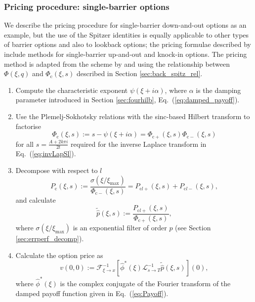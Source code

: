 \documentclass[11pt,a4paper]{article}
\begin{document}
\subsubsection{Pricing procedure: single-barrier options}\label{sec:updatedproc_sing}

We describe the pricing procedure for single-barrier down-and-out options as an example, but the use of the Spitzer identities is equally applicable to other types of barrier options and also to lookback options; the pricing formulae described by \cite{Green2010} include methods for single-barrier up-and-out and knock-in options. The pricing method is adapted from the scheme by \cite{Fusai2016} and \cite{Phelan2017} using the relationship between $\Phi(\xi,q)$ and $\Phi_{\mathrm{c}}(\xi,s)$ described in Section \ref{sec:back_spitz_rel}.
\begin{enumerate}
\item Compute the characteristic exponent $\psi(\xi+i\alpha)$, where $\alpha$ is the damping parameter introduced in Section \ref{sec:fourhilb}, Eq.~(\ref{eq:damped_payoff}).
\item Use the Plemelj-Sokhotsky relations with the sinc-based Hilbert transform to factorise
\begin{equation}
\label{eq:Phifact}
\Phi_{\mathrm{c}}(\xi,s):=s-\psi(\xi+i\alpha)=\Phi_{\mathrm{c}+}(\xi,s)\Phi_{\mathrm{c}-}(\xi,s)
\end{equation}
for all $s=\frac{A+2k\pi i}{2t}$ required for the inverse Laplace transform in Eq.~(\ref{eq:invLapSl}).
\item Decompose with respect to $l$ \label{item:Pdecomp}
\begin{equation}
\label{eq:Pdecomp1}
P_{\mathrm{c}}(\xi,s) := \frac{\sigma(\xi/\xi_{\max})}{\Phi_{\mathrm{c}-}(\xi,s)} = P_{\mathrm{c}l+}(\xi,s)+P_{\mathrm{c}l-}(\xi,s),
\end{equation}
and calculate
\begin{equation}
\label{eq:Probdist}
\widetilde{\widehat{p}}(\xi,s) := \frac{P_{\mathrm{c}l+}(\xi,s)}{\Phi_{\mathrm{c+}}(\xi,s)},
\end{equation}
where $\sigma(\xi/\xi_{\max})$ is an exponential filter of order $p$ (see Section \ref{sec:errperf_decomp}).
\item Calculate the option price as
\begin{equation}
\label{eq:Price}
v(0,0) := \mathcal{F}^{-1}_{\xi\rightarrow x}\left[\widehat{\phi}^*(\xi)\mathcal{L}^{-1}_{s\rightarrow T}\widetilde{\widehat{p}}(\xi,s)\right](0),
\end{equation}
where $\widehat{\phi}^*(\xi)$ is the complex conjugate of the Fourier transform of the damped payoff function given in Eq.~(\ref{eq:Payoff}).
\end{enumerate}
\end{document}
